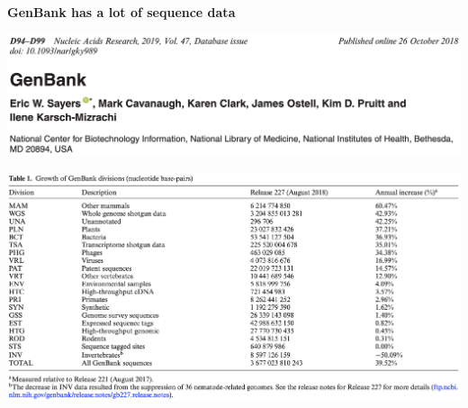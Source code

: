 \documentclass[landscape]{slides}
\begin{document}
\begin{slide}
\begin{center}
\textbf{GenBank has a lot of sequence data}
\end{center}

\includegraphics[width=9in]{figs/genbank-2019-title}

\includegraphics[width=9in]{figs/genbank-2019-table1}


\vfill
\end{slide}
\end{document}
